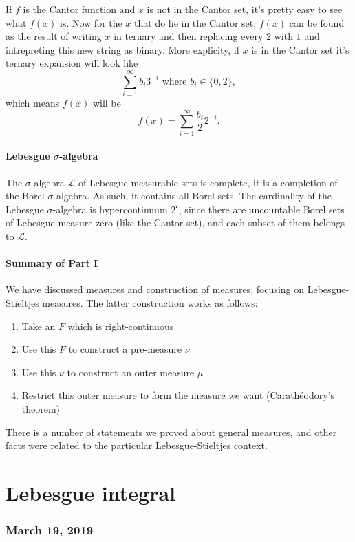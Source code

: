 \documentclass{article}
\theoremstyle{definition}
\begin{document}
If \( f \) is the Cantor function and \( x \) is not in the Cantor set, it's
pretty easy to see what \( f(x) \) is. Now for the \( x \) that do lie in
the Cantor set, \( f(x) \) can be found as the result of writing
\( x \) in ternary and then replacing every \( 2 \) with \( 1 \) and
intrepreting this new string as binary.
More explicity, if \( x \) is in the Cantor set it's ternary expansion will
look like
\begin{displaymath}
    \sum_{i = 1}^{\infty} b_{i} 3^{- i} \text{ where } b_{i} \in \{ 0,2 \},
\end{displaymath}
which means \( f(x) \) will be
\begin{displaymath}
    f(x) = \sum_{i = 1}^{\infty} \frac{b_{i}}{2} 2^{- i}.
\end{displaymath}

\subsection{Lebesgue $\sigma$-algebra}

The $\sigma$-algebra $\mathscr{L}$
of Lebesgue measurable
sets is complete, it is a completion of the Borel $\sigma$-algebra.
As such, it contains all Borel sets.
The cardinality of the Lebesgue $\sigma$-algebra is hypercontinuum
$2^{\mathfrak{c}}$, since there are uncountable 
Borel sets of Lebesgue measure zero (like the Cantor set), and 
each subset of them belongs to $\mathscr{L}$.

\subsection{Summary of Part I}

We have discussed measures and construction of measures,
focusing on Lebesgue-Stieltjes measures.
The latter construction works as follows:
\begin{enumerate}[1)]
		\item Take an \(F\) which is right-continuous
		\item Use this \(F\) to construct a pre-measure \(\nu\)
		\item Use this \(\nu\) to construct an outer measure \(\mu\)
		\item Restrict this outer measure to form the measure we want
				(Carath\'eodory's theorem)
\end{enumerate}

There is a number of statements we proved 
about general measures, and 
other facts were related to the particular Lebesgue-Stieltjes
context. 

\part{Lebesgue integral}

\section{March 19, 2019}
\end{document}
